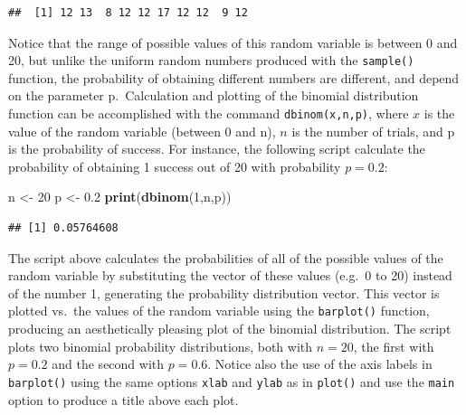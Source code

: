 \documentclass[
]{book}
\newenvironment{Shaded}{\begin{snugshade}}{\end{snugshade}}
\newcommand{\DecValTok}[1]{\textcolor[rgb]{0.00,0.00,0.81}{#1}}
\newcommand{\FloatTok}[1]{\textcolor[rgb]{0.00,0.00,0.81}{#1}}
\newcommand{\KeywordTok}[1]{\textcolor[rgb]{0.13,0.29,0.53}{\textbf{#1}}}
\newcommand{\NormalTok}[1]{#1}
\newcommand{\StringTok}[1]{\textcolor[rgb]{0.31,0.60,0.02}{#1}}
\theoremstyle{definition}
\theoremstyle{definition}
\theoremstyle{definition}
\theoremstyle{remark}
\begin{document}
\begin{verbatim}
##  [1] 12 13  8 12 12 17 12 12  9 12
\end{verbatim}

Notice that the range of possible values of this random variable is between 0 and 20, but unlike the uniform random numbers produced with the \texttt{sample()} function, the probability of obtaining different numbers are different, and depend on the parameter p.~Calculation and plotting of the binomial distribution function can be accomplished with the command \texttt{dbinom(x,n,p)}, where \(x\) is the value of the random variable (between 0 and n), \(n\) is the number of trials, and p is the probability of success. For instance, the following script calculate the probability of obtaining 1 success out of 20 with probability \(p=0.2\):

\begin{Shaded}
\begin{Highlighting}[]
\NormalTok{n \textless{}{-}}\StringTok{ }\DecValTok{20}
\NormalTok{p \textless{}{-}}\StringTok{ }\FloatTok{0.2}
\KeywordTok{print}\NormalTok{(}\KeywordTok{dbinom}\NormalTok{(}\DecValTok{1}\NormalTok{,n,p))}
\end{Highlighting}
\end{Shaded}

\begin{verbatim}
## [1] 0.05764608
\end{verbatim}

The script above calculates the probabilities of all of the possible values of the random variable by substituting the vector of these values (e.g.~0 to 20) instead of the number 1, generating the probability distribution vector. This vector is plotted vs.~the values of the random variable using the \texttt{barplot()} function, producing an aesthetically pleasing plot of the binomial distribution. The script plots two binomial probability distributions, both with \(n=20\), the first with \(p=0.2\) and the second with \(p=0.6\). Notice also the use of the axis labels in \texttt{barplot()} using the same options \texttt{xlab} and \texttt{ylab} as in \texttt{plot()} and use the \texttt{main} option to produce a title above each plot.
\end{document}
